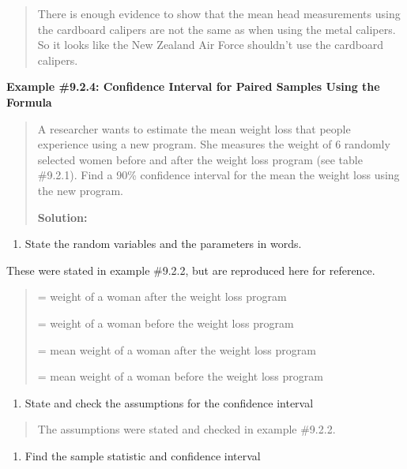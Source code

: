 \documentclass[]{book}
\providecommand{\tightlist}{%
  \setlength{\itemsep}{0pt}\setlength{\parskip}{0pt}}
\begin{document}
\begin{quote}
There is enough evidence to show that the mean head measurements using the cardboard calipers are not the same as when using the metal calipers. So it looks like the New Zealand Air Force shouldn't use the cardboard calipers.
\end{quote}

\textbf{Example \#9.2.4: Confidence Interval for Paired Samples Using the
Formula}

\begin{quote}
A researcher wants to estimate the mean weight loss that people experience using a new program. She measures the weight of 6 randomly selected women before and after the weight loss program (see table \#9.2.1). Find a 90\% confidence interval for the mean the weight loss using the new program.

\textbf{Solution:}
\end{quote}

\begin{enumerate}
\def\labelenumi{\arabic{enumi}.}
\tightlist
\item
  State the random variables and the parameters in words.
\end{enumerate}

These were stated in example \#9.2.2, but are reproduced here for reference.

\begin{quote}
= weight of a woman after the weight loss program

= weight of a woman before the weight loss program

= mean weight of a woman after the weight loss program

= mean weight of a woman before the weight loss program
\end{quote}

\begin{enumerate}
\def\labelenumi{\arabic{enumi}.}
\setcounter{enumi}{1}
\tightlist
\item
  State and check the assumptions for the confidence interval
\end{enumerate}

\begin{quote}
The assumptions were stated and checked in example \#9.2.2.
\end{quote}

\begin{enumerate}
\def\labelenumi{\arabic{enumi}.}
\setcounter{enumi}{2}
\tightlist
\item
  Find the sample statistic and confidence interval
\end{enumerate}
\end{document}
